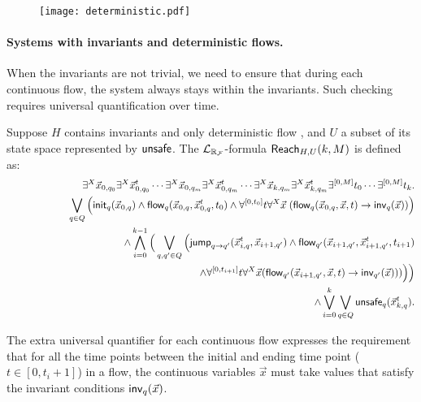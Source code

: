\documentclass[12pt]{article}
\begin{document}
\begin{figure}[h!]
\begin{center}
\texttt{[image: deterministic.pdf]}
\end{center}
\caption{}
\end{figure}

\paragraph{Systems with invariants and deterministic flows.} When the invariants are not trivial, we need to ensure that during each continuous flow, the system always stays within the invariants.
Such checking requires universal quantification over time.
\begin{definition}
Suppose $H$ contains invariants and only deterministic flow
, and $U$ a subset of its state space represented by $\mathsf{unsafe}$. The $\mathcal{L}_{\mathbb{R}_{\mathcal{F}}}$-formula $\mathsf{Reach}_{H,U}(k,M)$ is defined as:
\begin{eqnarray*}
& &\exists^X \vec x_{0,q_0} \exists^X\vec x_{0,q_0}^t\cdots \exists^X\vec
x_{0,q_m}\exists^X \vec x_{0,q_m}^t\cdots\exists^X \vec x_{k,q_m}\exists^X\vec x_{k,q_m}^t\exists^{[0,M]}t_0\cdots \exists^{[0,M]}t_k.\\
& &\bigvee_{q\in Q} \Big(\init_{q}(\vec x_{0,q})\wedge \flow_{q}(\vec x_{0,q}, \vec x_{0,q}^t, t_0)\wedge \forall^{[0,t_0]}t\forall^X\vec x\;(\flow_{q}(\vec x_{0,q}, \vec x, t)\rightarrow \inv_{q}(\vec x))\Big) \\
& &\wedge \bigwedge_{i=0}^{k-1}\Big( \bigvee_{q, q'\in Q} \Big(\jump_{q\rightarrow q'}(\vec
x_{i,q}^t, \vec x_{i+1,q'})\wedge \flow_{q'}(\vec x_{i+1,q'}, \vec x_{i+1,q'}^t, t_{i+1})\\
& &\hspace{6.3cm}\wedge \forall^{[0,t_{i+1}]}t\forall^X\vec x(\flow_{q'}(\vec x_{i+1,q'}, \vec x,
t)\rightarrow \inv_{q'}(\vec x)) )\Big)\Big)\\
& &\wedge\bigvee_{i=0}^k\bigvee_{q\in Q} \unsafe_q(\vec x_{k,q}^t).
\end{eqnarray*}
\end{definition}
The extra universal quantifier for each continuous flow expresses the requirement that for all the time points between the initial and ending time point ($t\in[0,t_i+1]$) in a flow, the continuous variables $\vec x$ must take values that satisfy the invariant conditions $\mathsf{inv}_q(\vec x)$.
\end{document}

